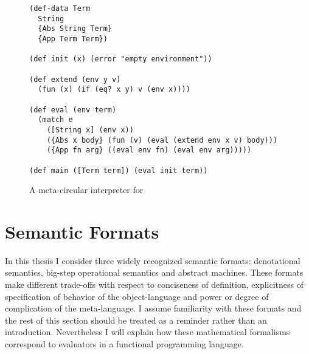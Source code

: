 \begin{figure}
    \centering
    \begin{lstlisting}
(def-data Term
  String
  {Abs String Term}
  {App Term Term})

(def init (x) (error "empty environment"))

(def extend (env y v)
  (fun (x) (if (eq? x y) v (env x))))

(def eval (env term)
  (match e
    ([String x] (env x))
    ({Abs x body} (fun (v) (eval (extend env x v) body)))
    ({App fn arg} ((eval env fn) (eval env arg)))))
        
(def main ([Term term]) (eval init term))
    \end{lstlisting}
    \caption{A meta-circular interpreter for \LC{}}
    \label{fig:lambda-calc-interp}
\end{figure}

\section{Semantic Formats}
In this thesis I consider three widely recognized semantic formats: denotational semantics, big-step operational semantics and abstract machines.
These formats make different trade-offs with respect to conciseness of definition, explicitness of specification of behavior of the object-language and power or degree of complication of the meta-language.
I assume familiarity with these formats and the rest of this section should be treated as a reminder rather than an introduction.
Nevertheless I will explain how these mathematical formalisms correspond to evaluators in a functional programming language.

